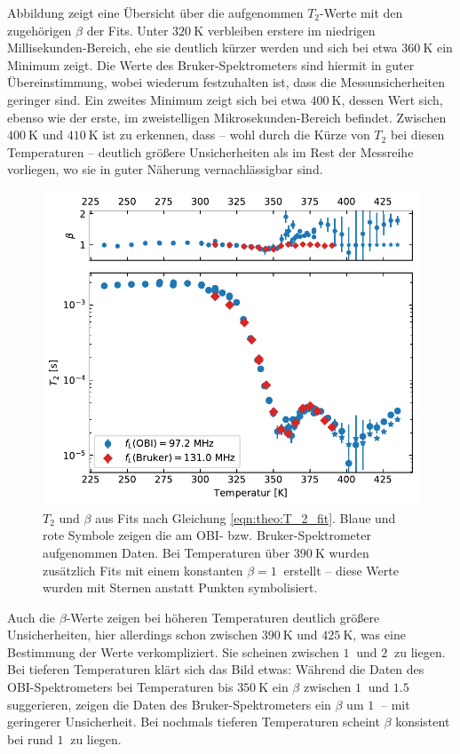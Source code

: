 Abbildung \label{fig:res:T_2} zeigt eine Übersicht über die aufgenommen $T_2$-Werte mit den zugehörigen $\beta$ der Fits. Unter $\SI{320}{\kelvin}$ verbleiben erstere im niedrigen Millisekunden-Bereich, ehe sie deutlich kürzer werden und sich bei etwa $\SI{360}{\kelvin}$ ein Minimum zeigt. Die Werte des Bruker-Spektrometers sind hiermit in guter Übereinstimmung, wobei wiederum festzuhalten ist, dass die Messunsicherheiten geringer sind. Ein zweites Minimum zeigt sich bei etwa $\SI{400}{\kelvin}$, dessen Wert sich, ebenso wie der erste, im zweistelligen Mikrosekunden-Bereich befindet. Zwischen $\SI{400}{\kelvin}$ und $\SI{410}{\kelvin}$ ist zu erkennen, dass -- wohl durch die Kürze von $T_2$ bei diesen Temperaturen -- deutlich größere Unsicherheiten als im Rest der Messreihe vorliegen, wo sie in guter Näherung vernachlässigbar sind.
\begin{figure}
	\begin{center}
		\includegraphics[width=.9\textwidth]{graphics/plot/t2.pdf}
	\end{center}
	\caption{$T_2$ und $\beta$ aus Fits nach Gleichung \eqref{eqn:theo:T_2_fit}. Blaue und rote Symbole zeigen die am OBI- bzw. Bruker-Spektrometer aufgenommen Daten. Bei Temperaturen über $\SI{390}{\kelvin}$ wurden zusätzlich Fits mit einem konstanten $\beta = \SI{1}{}$ erstellt -- diese Werte wurden mit Sternen anstatt Punkten symbolisiert.} \label{fig:res:T_2}
\end{figure}

Auch die $\beta$-Werte zeigen bei höheren Temperaturen deutlich größere Unsicherheiten, hier allerdings schon zwischen $\SI{390}{\kelvin}$ und $\SI{425}{\kelvin}$, was eine Bestimmung der Werte verkompliziert. Sie scheinen zwischen $\SI{1}{}$ und $\SI{2}{}$ zu liegen. Bei tieferen Temperaturen klärt sich das Bild etwas: Während die Daten des OBI-Spektrometers bei Temperaturen bis $\SI{350}{\kelvin}$ ein $\beta$ zwischen $\SI{1}{}$ und $\SI{1.5}{}$ suggerieren, zeigen die Daten des Bruker-Spektrometers ein $\beta$ um $\SI{1}{}$ -- mit geringerer Unsicherheit. Bei nochmals tieferen Temperaturen scheint $\beta$ konsistent bei rund $\SI{1}{}$ zu liegen.




